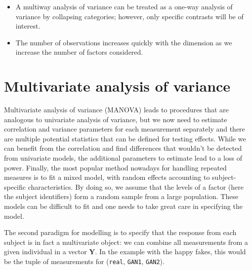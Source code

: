 \documentclass[
  11pt,
  letterpaper,
]{scrbook}
\providecommand{\tightlist}{%
  \setlength{\itemsep}{0pt}\setlength{\parskip}{0pt}}\usepackage{longtable,booktabs,array}
\theoremstyle{definition}
\theoremstyle{definition}
\theoremstyle{remark}
\begin{document}
\begin{tcolorbox}[enhanced jigsaw, opacityback=0, opacitybacktitle=0.6, leftrule=.75mm, colbacktitle=quarto-callout-important-color!10!white, breakable, toptitle=1mm, bottomrule=.15mm, title=\textcolor{quarto-callout-important-color}{\faExclamation}\hspace{0.5em}{\textbf{Summary}}, coltitle=black, colframe=quarto-callout-important-color-frame, colback=white, left=2mm, toprule=.15mm, arc=.35mm, bottomtitle=1mm, titlerule=0mm, rightrule=.15mm]

\begin{itemize}
\tightlist
\item
  A multiway analysis of variance can be treated as a one-way analysis
  of variance by collapsing categories; however, only specific contrasts
  will be of interest.
\item
  The number of observations increases quickly with the dimension as we
  increase the number of factors considered.
\end{itemize}

\end{tcolorbox}


\chapter{Multivariate analysis of
variance}\label{multivariate-analysis-of-variance}

Multivariate analysis of variance (MANOVA) leads to procedures that are
analogous to univariate analysis of variance, but we now need to
estimate correlation and variance parameters for each measurement
separately and there are multiple potential statistics that can be
defined for testing effects. While we can benefit from the correlation
and find differences that wouldn't be detected from univariate models,
the additional parameters to estimate lead to a loss of power. Finally,
the most popular method nowadays for handling repeated measures is to
fit a mixed model, with random effects accounting to subject-specific
characteristics. By doing so, we assume that the levels of a factor
(here the subject identifiers) form a random sample from a large
population. These models can be difficult to fit and one needs to take
great care in specifying the model.

The second paradigm for modelling is to specify that the response from
each subject is in fact a multivariate object: we can combine all
measurements from a given individual in a vector \(\boldsymbol{Y}\). In
the example with the happy fakes, this would be the tuple of
measurements for (\texttt{real}, \texttt{GAN1}, \texttt{GAN2}).
\end{document}
